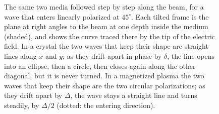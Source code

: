 \begin{figure}[htbp]
\caption{The same two media followed step by step along the beam, for a wave that enters linearly polarized at $45^\circ$. Each tilted frame is the plane at right angles to the beam at one depth inside
the medium (shaded), and shows the curve traced there by the tip of the electric field. In a crystal the two waves that keep their shape
are straight lines along $x$ and $y$; as they drift apart in phase by $\delta$, the line opens into an ellipse, then a circle, then
closes again along the other diagonal, but it is never turned. In a magnetized plasma the two waves that keep their shape are the
two circular polarizations; as they drift apart by $\Delta$, the wave stays a straight line and turns steadily, by $\Delta/2$
(dotted: the entering direction).}
\label{T1c:fig:lorentz-snapshots}
\end{figure}

